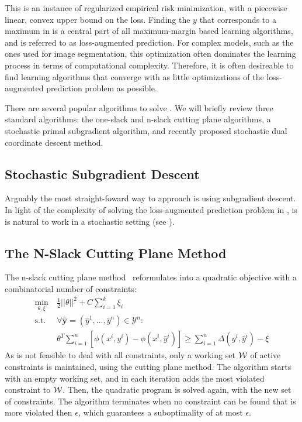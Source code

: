This is an instance of regularized empirical risk minimization, with a
piecewise linear, convex upper bound on the loss. 
Finding the $y$ that corresponds to a maximum in  is
a central part of all maximum-margin based learning algorithms, and is referred to
as loss-augmented prediction. For complex models, such as the ones used for
image segmentation, this optimization often dominates the learning process in
terms of computational complexity.
Therefore, it is often desireable to find learning algorithms that converge with
as little optimizations of the loss-augmented prediction problem as possible.

There are several popular algorithms to solve . We
will briefly review three standard algorithms: the one-slack and n-slack
cutting plane algorithms, a stochastic primal subgradient algorithm, and
recently proposed stochastic dual coordinate descent method.

\subsection{Stochastic Subgradient Descent}
Arguably the most straight-foward way to approach  is using subgradient descent.
In light of the complexity of solving the loss-augmented prediction problem in ,
is is natural to work in a stochastic setting (see \citet{ratliff2007online}).

\subsection{The N-Slack Cutting Plane Method}
The n-slack cutting plane method~\citep{tsochantaridis2006large} reformulates 
into a quadratic objective with a combinatorial number of constraints:
\begin{align}\label{eq:oneslack}
    \min_{\theta, \xi}\ &\frac{1}{2} ||\theta||^2 + C \sum_{i=1}^k \xi_i\\
    \text{s.t. }&\forall \hat{\mathbf{y}}=(\hat{y}^1, \dots, \hat{y}^n) \in \mathcal{Y}^n:\\
        &\theta^T \sum_{i=1}^n [\phi(x^i, y^i) - \phi(x^i,
            \hat{y}^i)] \geq \sum_{i=1}^n \Delta(y^i, \hat{y}^i)
            - \xi
\end{align}
As is not feasible to deal with all constraints, only a working set $\mathcal{W}$ of active constraints
is maintained, using the cutting plane method. The algorithm starts with an empty working set,
and in each iteration adds the most violated constraint to $\mathcal{W}$. Then, the quadratic program is solved
again, with the new set of constraints.
The algorithm terminates when no constraint can be found that is more violated then $\epsilon$,
which guarantees a suboptimality of at most $\epsilon$.

